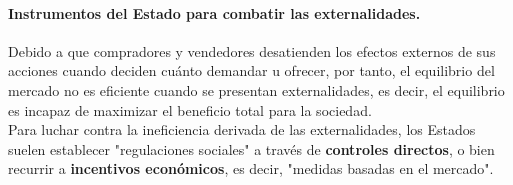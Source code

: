 \paragraph{{\normalsize Instrumentos del Estado para combatir las externalidades.}}
Debido a que compradores y vendedores desatienden los efectos externos de sus acciones cuando deciden cuánto demandar u ofrecer, por tanto, el equilibrio del mercado no es eficiente cuando se presentan externalidades, es decir, el equilibrio es incapaz de maximizar el beneficio total para la sociedad.\\

Para luchar contra la ineficiencia derivada de las externalidades, los Estados suelen establecer "regulaciones sociales" a través de \textbf{controles directos}, o bien recurrir a \textbf{incentivos económicos}, es decir, "medidas basadas en el mercado".
